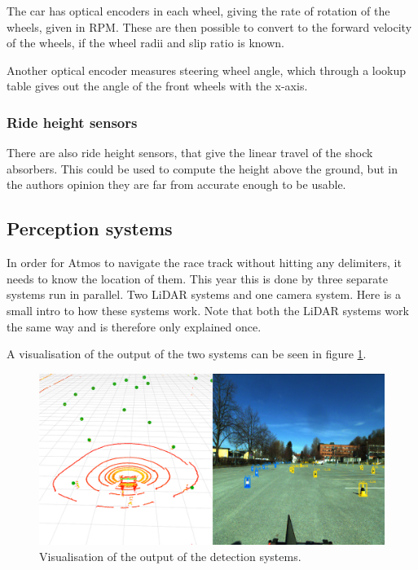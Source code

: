 The car has optical encoders in each wheel, giving the rate of rotation of the wheels, given in \gls{RPM}. These are then possible to convert to the forward velocity of the wheels, if the wheel radii and slip ratio is known. 

Another optical encoder measures steering wheel angle, which through a lookup table gives out the angle of the front wheels with the x-axis. 

\subsubsection{Ride height sensors}

There are also ride height sensors, that give the linear travel of the shock absorbers. This could be used to compute the height above the ground, but in the authors opinion they are far from accurate enough to be usable.


\subsection{Perception systems}

In order for Atmos to navigate the race track without hitting any delimiters, it needs to know the location of them. This year this is done by three separate systems run in parallel. Two \gls{LiDAR} systems and one camera system. Here is a small intro to how these systems work. Note that both the \gls{LiDAR} systems work the same way and is therefore only explained once.

A visualisation of the output of the two systems can be seen in figure \ref{Fig:LiDARCamViz}.

\begin{figure}
    \centering
    \includegraphics[width=\linewidth]{0_Images/3_Background/LiDARCam.png}
    \caption[Visualisation of the output of the detection systems.]{Visualisation of the output of the detection systems.}
    \label{Fig:LiDARCamViz}
\end{figure}

